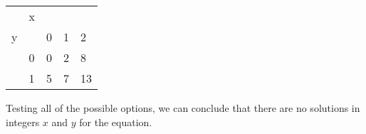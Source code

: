 \documentclass{article}
\begin{document}
\begin{table}[h]
\centering
\begin{tabular}{lllll}
 & x &  &  &  \\ \cline{2-5} 
\multicolumn{1}{l|}{y} & \multicolumn{1}{l|}{} & \multicolumn{1}{l|}{0} & \multicolumn{1}{l|}{1} & \multicolumn{1}{l|}{2} \\ \cline{2-5} 
\multicolumn{1}{l|}{} & \multicolumn{1}{l|}{0} & \multicolumn{1}{l|}{0} & \multicolumn{1}{l|}{2} & \multicolumn{1}{l|}{8} \\ \cline{2-5} 
\multicolumn{1}{l|}{} & \multicolumn{1}{l|}{1} & \multicolumn{1}{l|}{5} & \multicolumn{1}{l|}{7} & \multicolumn{1}{l|}{13} \\ \cline{2-5} 
\end{tabular}
\end{table}

Testing all of the possible options, we can conclude that there are no solutions in integers $x$ and $y$ for the equation.
\end{document}
